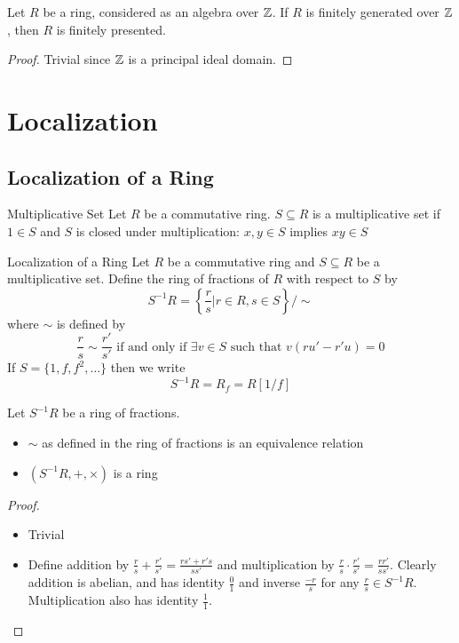 \documentclass[a4paper]{article}
\begin{document}
\begin{lmm}{}{} Let $R$ be a ring, considered as an algebra over $\mathbb{Z}$. If $R$ is finitely generated over $\mathbb{Z}$, then $R$ is finitely presented. \tcbline
\begin{proof}
Trivial since $\mathbb{Z}$ is a principal ideal domain. 
\end{proof}
\end{lmm}

\pagebreak
\section{Localization}
\subsection{Localization of a Ring}
\begin{defn}{Multiplicative Set}{} Let $R$ be a commutative ring. $S\subseteq R$ is a multiplicative set if $1\in S$ and $S$ is closed under multiplication: $x,y\in S$ implies $xy\in S$
\end{defn}

\begin{defn}{Localization of a Ring}{} Let $R$ be a commutative ring and $S\subseteq R$ be a multiplicative set. Define the ring of fractions of $R$ with respect to $S$ by $$S^{-1}R=\left\{\frac{r}{s}|r\in R,s\in S\right\}/\sim$$ where $\sim$ is defined by $$\frac{r}{s}\sim\frac{r'}{s'}\text{ if and only if }\exists v\in S\text{ such that }v(ru'-r'u)=0$$ If $S=\{1,f,f^2,\dots\}$ then we write $$S^{-1}R=R_f=R[1/f]$$
\end{defn}

\begin{prp}{}{} Let $S^{-1}R$ be a ring of fractions. 
\begin{itemize}
\item $\sim$ as defined in the ring of fractions is an equivalence relation
\item $(S^{-1}R,+,\times)$ is a ring
\end{itemize}\tcbline
\begin{proof}~\\
\begin{itemize}
\item Trivial
\item Define addition by $\frac{r}{s}+\frac{r'}{s'}=\frac{rs'+r's}{ss'}$ and multiplication by $\frac{r}{s}\cdot\frac{r'}{s'}=\frac{rr'}{ss'}$. Clearly addition is abelian, and has identity $\frac{0}{1}$ and inverse $\frac{-r}{s}$ for any $\frac{r}{s}\in S^{-1}R$. Multiplication also has identity $\frac{1}{1}$. 
\end{itemize}
\end{proof}
\end{prp}
\end{document}
